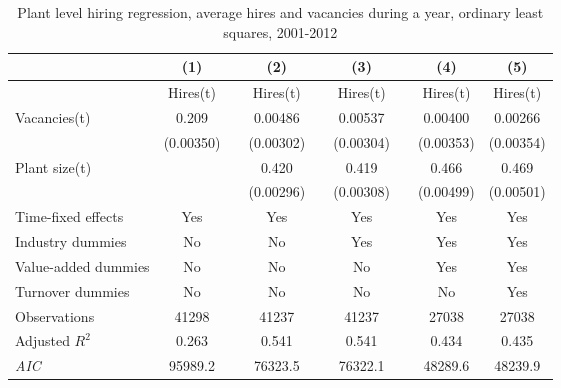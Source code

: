 \begin{table}[htbp]
\caption{\label{tab:robust_year_avg} Plant level hiring regression, average hires and vacancies during a year, ordinary least squares,  2001-2012}
\begin{tabularx} {\textwidth} { l  cXcXcXcc} 
\hline
       &   (1) &&     (2) &&    (3)       &&   (4)        &  (5)      \\
\hline
        &   \footnotesize{Hires(t)} &&     \footnotesize{Hires(t)} &&    \footnotesize{Hires(t)}      &&  \footnotesize{Hires(t)}       &    \footnotesize{Hires(t)}     \\
\hline
Vacancies(t) &      0.209\sym{***}&&     0.00486         &&     0.00537\sym{*} &&     0.00400         &     0.00266          \\
                    &   (0.00350)         &&   (0.00302)         &&  (0.00304)        &&   (0.00353)         &  (0.00354)          \\
Plant size(t)      &     &&                0.420\sym{***} &&       0.419\sym{***} &&       0.466\sym{***} &       0.469\sym{***} \\
                    &                   && (0.00296)         &&   (0.00308)         &&   (0.00499)         &   (0.00501)               \\
\hline
\footnotesize{Time-fixed effects}  & Yes                 && Yes                     &&           Yes          &&    Yes        &    Yes      \\
\footnotesize{Industry dummies}   & No                  && No                      &&     Yes                 &&    Yes        &  Yes      \\
\footnotesize{Value-added dummies} & No                  && No                      &&     No                 &&    Yes        &    Yes      \\
\footnotesize{Turnover dummies }   & No                  && No                      &&     No                 &&    No        &    Yes      \\
\hline
Observations        &    41298         &&       41237         &&       41237         &&       27038         &      27038      \\
Adjusted \(R^{2}\)  &     0.263         &&       0.541         &&       0.541         &&       0.434         &       0.435        \\
\textit{AIC}        &  95989.2         &&     76323.5         &&     76322.1         &&     48289.6         &     48239.9              \\
\hline\hline

\end{tabularx}
\end{table}
